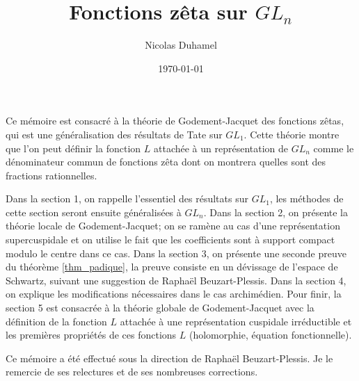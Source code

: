 \documentclass{amsart}
\begin{document}
\title{Fonctions zêta sur $GL_n$}
\author{Nicolas Duhamel}
\date{\today}
\maketitle

Ce mémoire est consacré à la théorie de Godement-Jacquet \cite{godement-jacquet} des fonctions zêtas, qui est une généralisation des résultats de Tate \cite{tate} sur $GL_1$. Cette théorie montre que l'on peut définir la fonction $L$ attachée à un représentation de $GL_n$ comme le dénominateur commun de fonctions zêta dont on montrera quelles sont des fractions rationnelles.

Dans la section 1, on rappelle l'essentiel des résultats sur $GL_1$, les méthodes de cette section seront ensuite généralisées à $GL_n$. Dans la section 2, on présente la théorie locale de Godement-Jacquet; on se ramène au cas d'une représentation supercuspidale et on utilise le fait que les coefficients sont à support compact modulo le centre dans ce cas. Dans la section 3, on présente une seconde preuve du théorème \ref{thm_padique}, la preuve consiste en un dévissage de l'espace de Schwartz, suivant une suggestion de Raphaël Beuzart-Plessis. Dans la section 4, on explique les modifications nécessaires dans le cas archimédien. Pour finir, la section 5 est consacrée à la théorie globale de Godement-Jacquet avec la définition de la fonction $L$ attachée à une représentation cuspidale irréductible et les premières propriétés de ces fonctions $L$ (holomorphie, équation fonctionnelle).

Ce mémoire a été effectué sous la direction de Raphaël Beuzart-Plessis. Je le remercie de ses relectures et de ses nombreuses corrections.

\tableofcontents











 
\end{document}
